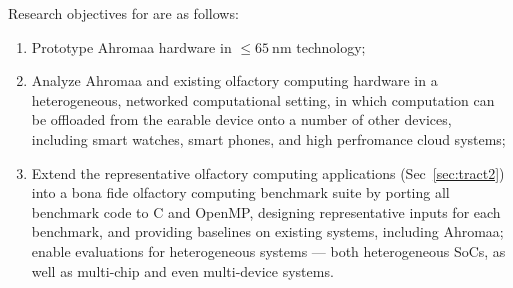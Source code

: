 Research objectives for \olfc{} are as follows:

\begin{enumerate}
\item Prototype Ahromaa hardware in \(\leq \SI{65}{\nano\meter}\) technology;
\item Analyze Ahromaa and existing olfactory computing hardware in a heterogeneous, networked
     computational setting, in which computation can be offloaded from the earable
     device onto a number of other devices, including smart watches, smart phones,
     and high perfromance cloud systems;
\item Extend the representative olfactory computing applications (Sec~\ref{sec:tract2})
    into a bona fide olfactory computing benchmark suite by
    porting all benchmark code to C and OpenMP, designing representative inputs
    for each benchmark, and providing baselines on existing systems, including
    Ahromaa; enable evaluations for heterogeneous systems --- both
    heterogeneous SoCs, as well as multi-chip and even multi-device systems.
\end{enumerate}

